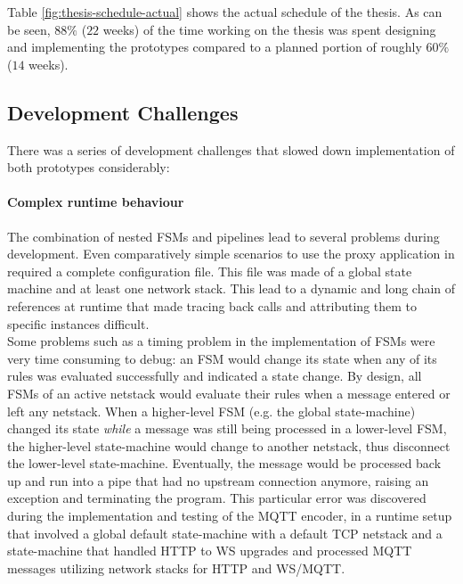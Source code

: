 Table \ref{fig:thesis-schedule-actual} shows the actual schedule of the thesis. As can be seen, $88\%$ ($22$ weeks) of the time working on the thesis was spent designing and implementing the prototypes compared to a planned portion of roughly $60\%$ ($14$ weeks).

\subsection{Development Challenges}
\label{sec:pm-challenges}
There was a series of development challenges that slowed down implementation of both prototypes considerably:
\paragraph{Complex runtime behaviour} The combination of nested \acp{FSM} and pipelines lead to several problems during development. Even comparatively simple scenarios to use the proxy application in required a complete configuration file. This file was made of a global state machine and at least one network stack. This lead to a dynamic and long chain of references at runtime that made tracing back calls and attributing them to specific instances difficult.\\
Some problems such as a timing problem in the implementation of \acp{FSM} were very time consuming to debug: an \ac{FSM} would change its state when any of its rules was evaluated successfully and indicated a state change. By design, all \acp{FSM} of an active netstack would evaluate their rules when a message entered or left any netstack. When a higher-level \ac{FSM} (e.g. the global state-machine) changed its state \emph{while} a message was still being processed in a lower-level \ac{FSM}, the higher-level state-machine would change to another netstack, thus disconnect the lower-level state-machine. Eventually, the message would be processed back up and run into a pipe that had no upstream connection anymore, raising an exception and terminating the program. This particular error was discovered during the implementation and testing of the \ac{MQTT} encoder, in a runtime setup that involved a global default state-machine with a default \ac{TCP} netstack and a state-machine that handled \ac{HTTP} to \ac{WS} upgrades and processed \ac{MQTT} messages utilizing network stacks for \ac{HTTP} and \ac{WS}/\ac{MQTT}.\\

